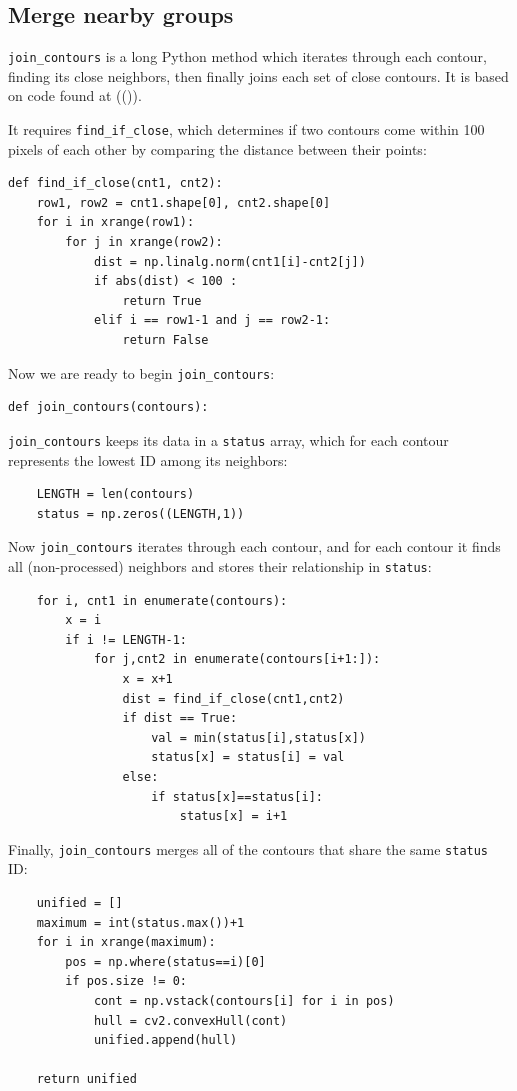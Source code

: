 \documentclass[notitlepage,12pt]{article}
\newcommand{\mycite}[1]{((\bibentry{#1}))}
\begin{document}
\subsection{Merge nearby groups}

\texttt{join\_contours} is a long Python method which iterates through each contour, finding its close neighbors, then finally joins each set of close contours.  It is based on code found at \mycite{join}.


It requires \texttt{find\_if\_close}, which determines if two contours come within 100 pixels of each other by comparing the distance between their points:
\begin{lstlisting}
def find_if_close(cnt1, cnt2):
    row1, row2 = cnt1.shape[0], cnt2.shape[0]
    for i in xrange(row1):
        for j in xrange(row2):
            dist = np.linalg.norm(cnt1[i]-cnt2[j])
            if abs(dist) < 100 :
                return True
            elif i == row1-1 and j == row2-1:
                return False
\end{lstlisting}

Now we are ready to begin \texttt{join\_contours}:
\begin{lstlisting}
def join_contours(contours):
\end{lstlisting}

\texttt{join\_contours} keeps its data in a \texttt{status} array, which for each contour represents the lowest ID among its neighbors:
\begin{lstlisting}
    LENGTH = len(contours)
    status = np.zeros((LENGTH,1))
\end{lstlisting}

Now \texttt{join\_contours} iterates through each contour, and for each contour it finds all (non-processed) neighbors and stores their relationship in \texttt{status}:
\begin{lstlisting}
    for i, cnt1 in enumerate(contours):
        x = i    
        if i != LENGTH-1:
            for j,cnt2 in enumerate(contours[i+1:]):
                x = x+1
                dist = find_if_close(cnt1,cnt2)
                if dist == True:
                    val = min(status[i],status[x])
                    status[x] = status[i] = val
                else:
                    if status[x]==status[i]:
                        status[x] = i+1
\end{lstlisting}

Finally, \texttt{join\_contours} merges all of the contours that share the same \texttt{status} ID:
\begin{lstlisting}
    unified = []
    maximum = int(status.max())+1
    for i in xrange(maximum):
        pos = np.where(status==i)[0]
        if pos.size != 0:
            cont = np.vstack(contours[i] for i in pos)
            hull = cv2.convexHull(cont)
            unified.append(hull)

    return unified
\end{lstlisting}
\end{document}
